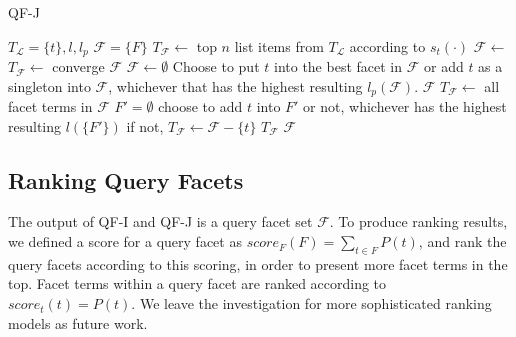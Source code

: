 \begin{algorithm}[ht!]
 \caption{QF-J}
\label{alg:qfj}
\begin{algorithmic}[1]
  \Require $T_{\mathcal{L}}=\{t\}, l, l_p$
  \Ensure $\mathcal{F}=\{F\}$
  \State $T_\mathcal{F} \leftarrow$ top $n$ list items from $T_{\mathcal{L}}$ according to $s_t(\cdot)$ 
  \Repeat
  \State $\mathcal{F}\leftarrow$ 
  \State $T_\mathcal{F}\leftarrow$ 
  \Until converge
  \State \Return $\mathcal{F}$
  \State
    \State $\mathcal{F} \leftarrow \emptyset$ 
      \State Choose to put $t$ into the best facet in $\mathcal{F}$ or add $t$ as a singleton into $\mathcal{F}$, whichever that has the highest resulting $l_p(\mathcal{F})$.
    \EndFor 
  \State \Return $\mathcal{F}$
  \EndFunction 
  \State
{}
  \State $T_\mathcal{F}\leftarrow$ all facet terms in $\mathcal{F}$
    \State $F'=\emptyset$
      \State choose to add $t$ into $F'$ or not, whichever has the highest resulting $l(\{F'\})$
      \State if not, $T_\mathcal{F}\leftarrow \mathcal{F} - \{t\}$
    \EndFor
  \EndFor
  \State \Return  $T_\mathcal{F}$
\EndFunction 
  \State \Return $\mathcal{F}$
\end{algorithmic}
\end{algorithm}

\subsection{Ranking Query Facets}
The output of QF-I and QF-J is a query facet set $\mathcal{F}$. To produce ranking results, we defined a score for a query facet as $score_F(F)=\sum_{t \in F}{P(t)}$, and rank the query facets according to this scoring, in order to present more facet terms in the top. Facet terms within a query facet are ranked according to $score_t(t)=P(t)$. We leave the investigation for more sophisticated ranking models as future work.

